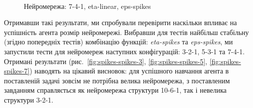 \documentclass[a4paper,10pt,fleqn]{article}
\begin{document}
\begin{figure}[h!]
  \centering
  \,
  \,
  \caption{Нейромережа: 7-4-1, eta-linear, eps-spikes}
  \label{fig:7-4-linear-spikes}
\end{figure}

Отримавши такі результати, ми спробували перевірити наскільки впливає на успішність агента розмір нейромережі. Вибравши для тестів найбільш стабільну (згідно попередніх тестів) комбінацію функцій: \textit{eta-spikes} та \textit{eps-spikes}, ми запустили тести для нейромереж наступних конфігурацій: 3-2-1, 5-3-1 та 7-4-1. Отримані результати (рис.~\ref{fig:spikes-spikes-3}, \ref{fig:spikes-spikes-5}, \ref{fig:spikes-spikes-7}) наводять на цікавий висновок: для успішного навчання агента в поставленій задачі зовсім не потрібна велика нейромережа, з поставленим завданням справляється як нейромережа структури 10-6-1, так і невелика структури 3-2-1.
\end{document}
